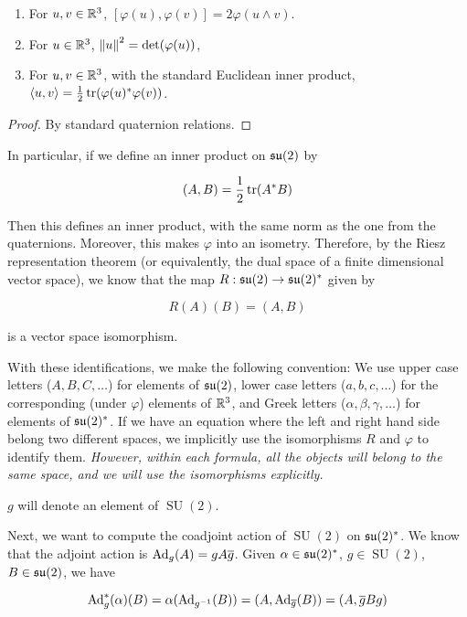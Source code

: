\documentclass{article}
\newcommand{\su}{\mfs\mfu}
\DeclareMathOperator{\SU}{SU}
\begin{document}
\begin{proposition}
    \leavevmode
    \begin{enumerate}
        \item For \(u, v \in \mathbb{R}^3\), \([\varphi(u), \varphi(v)] = 2\varphi(u \wedge v)\).
        \item For \(u \in \mathbb{R}^3\), \(\norm{u}^2 = \det(\varphi(u))\),
        \item For \(u, v \in \mathbb{R}^3\), with the standard Euclidean inner product, \(\left\langle u, v \right\rangle = \frac{1}{2}\tr(\varphi(u)^*\varphi(v))\).
    \end{enumerate}
\end{proposition}

\begin{proof}
    By standard quaternion relations.
\end{proof}

In particular, if we define an inner product on \(\su(2)\) by

\[(A, B) = \frac{1}{2}\tr(A^*B)\]

Then this defines an inner product, with the same norm as the one from the quaternions. Moreover, this makes \(\varphi\) into an isometry. Therefore, by the Riesz representation theorem (or equivalently, the dual space of a finite dimensional vector space), we know that the map \(R : \su(2) \to \su(2)^*\) given by

\[R(A)(B) = (A, B)\]

is a vector space isomorphism.

With these identifications, we make the following convention: We use upper case letters (\(A, B, C, \dots\)) for elements of \(\su(2)\), lower case letters (\(a, b, c, \dots\)) for the corresponding (under \(\varphi\)) elements of \(\mathbb{R}^3\), and Greek letters (\(\alpha, \beta, \gamma, \dots\)) for elements of \(\su(2)^*\). If we have an equation where the left and right hand side belong two different spaces, we implicitly use the isomorphisms \(R\) and \(\varphi\) to identify them. \emph{However, within each formula, all the objects will belong to the same space, and we will use the isomorphisms explicitly.}

\(g\) will denote an element of \(\SU(2)\).

Next, we want to compute the coadjoint action of \(\SU(2)\) on \(\su(2)^*\). We know that the adjoint action is \(\operatorname{Ad}_g(A) = gA\overline g\). Given \(\alpha \in \su(2)^*\), \(g \in \SU(2)\), \(B \in \su(2)\), we have

\[\operatorname{Ad}_g^*(\alpha)(B) = \alpha(\operatorname{Ad}_{g^{-1}}(B)) = (A, \operatorname{Ad}_{\overline g}(B)) = (A, \overline g B g)\]
\end{document}
